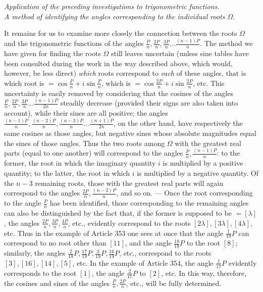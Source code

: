 \begin{center}\itshape \textit{Application of the preceding investigations to trigonometric functions.}\\\textit{A method of identifying the angles corresponding to the individual roots \(\Omega\).}\end{center}


It remains for us to examine more closely the connection between the roots \(\Omega\) and the trigonometric functions of the angles \(\frac Pn,\allowbreak \frac{2P}n,\allowbreak \frac{3P}n\ldots\frac{(n-1)P}n\). The method we have given for finding the roots \(\Omega\) still leaves uncertain (unless sine tables have been consulted during the work in the way described above, which would, however, be less direct) \textit{which} roots correspond to \textit{each} of these angles, \(\text{that is}\) which root is \(=\cos\frac Pn+i\sin\frac Pn\), which is \(=\cos\frac{2P}n+i\sin\frac{2P}n\), etc. This uncertainty is easily removed by considering that the cosines of the angles \(\frac Pn,\allowbreak \frac{2P}n,\allowbreak \frac{3P}n\ldots\frac{(n-1)P}{2n}\) steadily decrease (provided their signs are also taken into account), while their sines are all positive; the angles \(\frac{(n-1)P}n,\allowbreak \frac{(n-2)P}n,\allowbreak \frac{(n-3)P}n\ldots\frac{(n+1)P}{2n}\), on the other hand, have respectively the same cosines as those angles, but negative sines whose absolute magnitudes equal the sines of those angles. Thus the two roots among \(\Omega\) with the greatest real parts (equal to one another) will correspond to the angles \(\frac Pn,\allowbreak \frac{(n-1)P}n\): to the former, the root in which the imaginary quantity \(i\) is multiplied by a positive quantity; to the latter, the root in which \(i\) is multiplied by a negative quantity. Of the \(n-3\) remaining roots, those with the greatest real parts will again correspond to the angles \(\frac{2P}n,\allowbreak \frac{(n-2)P}n\), and so on. — Once the root corresponding to the angle \(\frac Pn\) has been identified, those corresponding to the remaining angles can also be distinguished by the fact that, if the former is supposed to be \(=[\lambda]\), the angles \(\frac{2P}n,\allowbreak \frac{3P}n,\allowbreak \frac{4P}n\), etc., evidently correspond to the roots \([2\lambda],\allowbreak [3\lambda],\allowbreak [4\lambda]\), etc. Thus in the example of Article 353 one sees at once that the angle \(\frac1{19}P\) can correspond to no root other than \([11]\), and the angle \(\frac{18}{19}P\) to the root \([8]\); similarly, the angles \(\frac2{19}P,\allowbreak \frac{17}{19}P,\allowbreak \frac3{19}P,\allowbreak \frac{16}{19}P\), etc., correspond to the roots \([3],\allowbreak [16],\allowbreak [14],\allowbreak [5]\), etc. In the example of Article 354, the angle \(\frac1{17}P\) evidently corresponds to the root \([1]\), the angle \(\frac2{17}P\) to \([2]\), etc. In this way, therefore, the cosines and sines of the angles \(\frac Pn,\allowbreak \frac{2P}n\), etc., will be fully determined.

